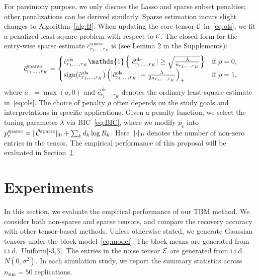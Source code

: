 \documentclass{article}
\begin{document}
For parsimony purpose, we only discuss the Lasso and sparse subset penalties; other penalizations can be derived similarly. Sparse estimation incurs slight changes to Algorithm~\ref{alg:B}. When updating the core tensor $\mathcal{C}$ in~\eqref{eq:ols}, we fit a penalized least square problem with respect to $\mathcal{C}$. 
The closed form for the entry-wise sparse estimate $\hat c^{\text{sparse}}_{r_1,\ldots,r_K}$ is (see Lemma 2 in the Supplements):
\begin{equation}\label{eq:lasso}
\hat c^{\text{sparse}}_{r_1,\ldots,r_K}=
\begin{cases}
\hat c^{\text{ols}}_{r_1,\ldots,r_K}\mathds{1}\left\{|\hat c^{\text{ols}}_{r_1,\ldots,r_K} |\geq {\sqrt{\lambda \over n_{r_1,\ldots,r_K}}}\right\} & \text{if}\ \rho=0,\\
\text{sign}(\hat c^{\text{ols}}_{r_1,\ldots,r_K})\left(| \hat c^{\text{ols}}_{r_1,\ldots,r_K}|-{\lambda \over 2n_{r_1,\ldots,r_K}}  \right)_{+} &\text{if}\ \rho=1,
\end{cases}
\end{equation}
where $a_{+}=\max(a,0)$ and $\hat c^{\text{ols}}_{r_1,\ldots,r_K}$ denotes the ordinary least-square estimate in~\eqref{eq:ols}. The choice of penalty $\rho$ often depends on the study goals and interpretations in specific applications. Given a penalty function, we select the tuning parameter $\lambda$ via BIC~\eqref{eq:BIC}, where we modify $p_e$ into $p^{\text{sparse}}_e=\lVert\hat {\mathcal{C}}^{\text{sparse}}\rVert_0+\sum_kd_k\log R_k$. Here $\lVert\cdot\rVert_0$ denotes the number of non-zero entries in the tensor. The empirical performance of this proposal will be evaluated in Section~\ref{sec:simulation}. 


\section{Experiments}\label{sec:simulation}

In this section, we evaluate the empirical performance of our TBM method. We consider both non-sparse and sparse tensors, and compare the recovery accuracy with other tensor-based methods. Unless otherwise stated, we generate Gaussian tensors under the block model~\eqref{eq:model}. The block means are generated from  i.i.d.\ Uniform[-3,3]. The entries in the noise tensor $\mathcal{E}$ are generated from i.i.d.\ $N(0,\sigma^2)$. In each simulation study, we report the summary statistics across $n_{\text{sim}}=50$ replications. 
\end{document}
